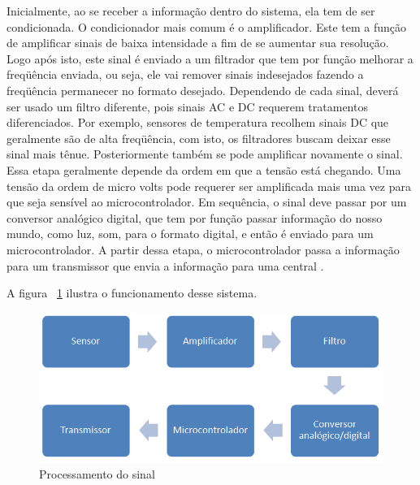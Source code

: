 \begin{enumerate}
	Inicialmente, ao se receber a informação dentro do sistema, ela tem de ser condicionada. O condicionador mais comum é
	o amplificador. Este tem a função de amplificar sinais de baixa intensidade a fim de se aumentar sua resolução. Logo
	após isto, este sinal é enviado a um filtrador que tem por função melhorar a freqüência enviada, ou seja, ele vai
	remover sinais indesejados fazendo a freqüência permanecer no formato desejado. Dependendo de cada sinal, deverá ser
	usado um filtro diferente, pois sinais AC e DC requerem tratamentos diferenciados. Por exemplo, sensores de temperatura 
	recolhem sinais DC que geralmente são de alta freqüência, com isto, os filtradores buscam deixar esse sinal mais tênue.
	Posteriormente também se pode amplificar novamente o sinal. Essa etapa geralmente depende da ordem em que a tensão está
	chegando. Uma tensão da ordem de micro volts pode requerer ser amplificada mais uma vez para que seja sensível ao
	microcontrolador. Em sequência, o sinal deve passar por um conversor analógico digital, que tem por função passar
	informação do nosso mundo, como luz, som, para o formato digital, e então é enviado para um microcontrolador. A partir
	dessa etapa, o microcontrolador passa a informação para um transmissor que envia a informação para uma central \footnotemark.
	
	
	A figura ~\ref{funcionamento_microcontrolador} ilustra o funcionamento desse sistema.
	
	\begin{figure}[!h]
	  \centering
	  \includegraphics[scale=0.6]{editaveis/figuras/funcionamento_microcontrolador}
	  \caption[Processamento do sinal]{Processamento do sinal}
	  \FloatBarrier
	  \label{funcionamento_microcontrolador}
	\end{figure}
	
  \end{enumerate}
  
  \vfill